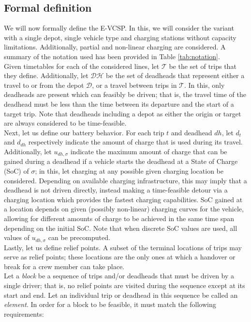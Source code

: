 \documentclass[]{article}
\begin{document}
\subsection{Formal definition}
We will now formally define the E-VCSP. In this, we will consider the variant with a single depot, single vehicle type and charging stations without capacity limitations. Additionally, partial and non-linear charging are considered. A summary of the notation used has been provided in Table \ref{tab:notation}. \\
Given timetables for each of the considered lines, let $\mathcal{T}$ be the set of trips that they define. Additionally, let $\mathcal{DH}$ be the set of deadheads that represent either a travel to or from the depot $\mathcal{D}$, or a travel between trips in $\mathcal{T}$. In this, only deadheads are present which can feasibly be driven; that is, the travel time of the deadhead must be less than the time between its departure and the start of a target trip. Note that deadheads including a depot as either the origin or target are always considered to be time-feasible. \\ 
Next, let us define our battery behavior. For each trip $t$ and deadhead $dh$, let $d_t$ and $d_{dh}$ respectively indicate the amount of charge that is used during its travel. Additionally, let $u_{dh,\sigma}$ indicate the maximum amount of charge that can be gained during a deadhead if a vehicle starts the deadhead at a State of Charge (SoC) of $\sigma$; in this, let charging at any possible given charging location be considered. Depending on available charging infrastructure, this may imply that a deadhead is not driven directly, instead making a time-feasible detour via a charging location which provides the fastest charging capabilities. SoC gained at a location depends on given (possibly non-linear) charging curves for the vehicle, allowing for different amounts of charge to be achieved in the same time span depending on the initial SoC. Note that when discrete SoC values are used, all values of $u_{dh,\sigma}$ can be precomputed. \\
Lastly, let us define relief points. A subset of the terminal locations of trips may serve as relief points; these locations are the only ones at which a handover or break for a crew member can take place.\\
Let a \textit{block} be a sequence of trips and/or deadheads that must be driven by a single driver; that is, no relief points are visited during the sequence except at its start and end. Let an individual trip or deadhead in this sequence be called an \textit{element}. In order for a block to be feasible, it must match the following requirements: 
\end{document}
